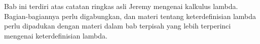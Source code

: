 \documentclass[../../../include/open-logic-chapter]{subfiles}
\begin{document}

\begin{editorial}
Bab ini terdiri atas catatan ringkas asli Jeremy mengenai kalkulus lambda.
Bagian-bagiannya perlu digabungkan, dan materi tentang keterdefinisian lambda
perlu dipadukan dengan materi dalam bab terpisah yang lebih terperinci mengenai
keterdefinisian lambda.
\end{editorial}














\OLEndChapterHook
\end{document}
